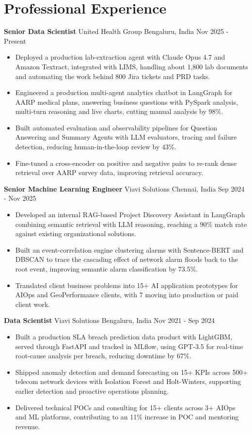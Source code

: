 \documentclass[10pt,a4paper]{article}
\newcommand{\role}[4]{\textbf{#1} \textbar{} #2 \hfill #3 \textbar{} #4\par}
\begin{document}
\section{Professional Experience}
\role{Senior Data Scientist}{United Health Group}{Bengaluru, India}{Nov 2025 - Present}
\begin{itemize}
  \item Deployed a production lab-extraction agent with Claude Opus 4.7 and Amazon Textract, integrated with LIMS, handling about 1,800 lab documents and automating the work behind 800 Jira tickets and PRD tasks.
  \item Engineered a production multi-agent analytics chatbot in LangGraph for AARP medical plans, answering business questions with PySpark analysis, multi-turn reasoning and live charts, cutting manual analysis by 98\%.
  \item Built automated evaluation and observability pipelines for Question Answering and Summary Agents with LLM evaluators, tracing and failure detection, reducing human-in-the-loop review by 43\%.
  \item Fine-tuned a cross-encoder on positive and negative pairs to re-rank dense retrieval over AARP survey data, improving retrieval accuracy.
\end{itemize}
\vspace{3pt}
\role{Senior Machine Learning Engineer}{Viavi Solutions}{Chennai, India}{Sep 2024 - Nov 2025}
\begin{itemize}
  \item Developed an internal RAG-based Project Discovery Assistant in LangGraph combining semantic retrieval with LLM reasoning, reaching a 90\% match rate against existing organizational solutions.
  \item Built an event-correlation engine clustering alarms with Sentence-BERT and DBSCAN to trace the cascading effect of network alarm floods back to the root event, improving semantic alarm classification by 73.5\%.
  \item Translated client business problems into 15+ AI application prototypes for AIOps and GeoPerformance clients, with 7 moving into production or paid client work.
\end{itemize}
\vspace{3pt}
\role{Data Scientist}{Viavi Solutions}{Bengaluru, India}{Nov 2021 - Sep 2024}
\begin{itemize}
  \item Built a production SLA breach prediction data product with LightGBM, served through FastAPI and tracked in MLflow, using GPT-3.5 for real-time root-cause analysis per breach, reducing downtime by 67\%.
  \item Shipped anomaly detection and demand forecasting on 15+ KPIs across 500+ telecom network devices with Isolation Forest and Holt-Winters, supporting earlier detection and proactive operations planning.
  \item Delivered technical POCs and consulting for 15+ clients across 3+ AIOps and ML platforms, contributing to an 11\% increase in POC and mentoring revenue.
\end{itemize}
\end{document}
